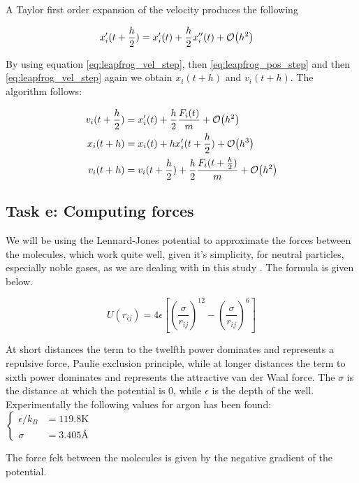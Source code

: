 \documentclass[11pt]{article}
\begin{document}
		\noindent A Taylor first order expansion of the velocity produces the following

		\begin{align}
			x'_i(t+\frac{h}{2}) &= x_i'(t)  + \frac{h}{2}x_i''(t) + \order{h^2} \label{eq:leapfrog_vel_step}
		\end{align}

		\noindent By using equation \eqref{eq:leapfrog_vel_step}, then \eqref{eq:leapfrog_pos_step} and then \eqref{eq:leapfrog_vel_step} again we obtain \(x_i(t+h)\) and \(v_i(t+h)\). The algorithm follows:

		\begin{align*}
		v_i(t+\frac{h}{2}) &= x_i'(t)  + \frac{h}{2}\frac{F_i(t)}{m} + \order{h^2} 
		\\
		x_i(t+h) &= x_i(t) + hx_i'(t+ \frac{h} {2} ) + \order{h ^ 3}
		\\
		v_i(t+h) &= v_i(t+\frac{h}{2})  +  \frac{h}{2}\frac{F_i(t+ \frac{h}{2})}{m} + \order{h^2} 
		\end{align*}

\subsection{Task e: Computing forces}

\label{sub:potential}
		We will be using the Lennard-Jones potential to approximate the forces between the molecules, which work quite well, given it's simplicity, for neutral particles, especially noble gases, as we are dealing with in this study \cite{Wiki}. The formula is given below.

		\[
		U(r_{ij}) = 4 \epsilon \left[ \left( \frac{\sigma}{r_{ij}} \right)^{12} - \left( \frac{\sigma}{r_{ij}} \right)^{6} \right]
		\]
		
		At short distances the term to the twelfth power dominates and represents a repulsive force, Paulie exclusion principle, while at longer distances the term to sixth power dominates and represents the attractive van der Waal force. The \(\sigma \) is the distance at which the potential is \(0\), while \( \epsilon  \) is the depth of the well. \\
		Experimentally the following values for argon has been found: 
		\(
		\begin{cases}
		\epsilon/k_B &= 119.8 \text{K} 
		\\
		\sigma &= 3.405 \text{\AA}
		\end{cases}
		\)


		\noindent The force felt between the molecules is given by the negative gradient of the potential.
\end{document}
